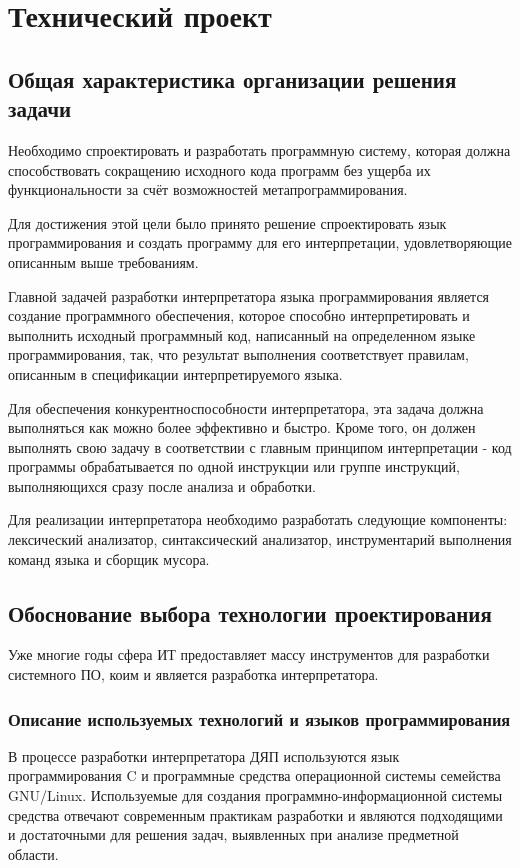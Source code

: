\section{Технический проект}
\subsection{Общая характеристика организации решения задачи}

Необходимо спроектировать и разработать программную систему, которая должна способствовать сокращению исходного кода программ без ущерба их функциональности за счёт возможностей метапрограммирования.

Для достижения этой цели было принято решение спроектировать язык программирования и создать программу для его интерпретации, удовлетворяющие описанным выше требованиям.

Главной задачей разработки интерпретатора языка программирования является создание программного обеспечения, которое способно интерпретировать и выполнить исходный программный код, написанный на определенном языке программирования, так, что результат выполнения соответствует правилам, описанным в спецификации интерпретируемого языка.

Для обеспечения конкурентноспособности интерпретатора, эта задача должна выполняться как можно более эффективно и быстро. Кроме того, он должен выполнять свою задачу в соответствии с главным принципом интерпретации - код программы обрабатывается по одной инструкции или группе инструкций, выполняющихся сразу после анализа и обработки. 

Для реализации интерпретатора необходимо разработать следующие компоненты: лексический анализатор, синтаксический анализатор, инструментарий выполнения команд языка и сборщик мусора.

\subsection{Обоснование выбора технологии проектирования}

Уже многие годы сфера ИТ предоставляет массу инструментов для разработки системного ПО, коим и является разработка интерпретатора.

\subsubsection{Описание используемых технологий и языков программирования}

В процессе разработки интерпретатора ДЯП используются язык программирования C и программные средства операционной системы семейства GNU/Linux. Используемые для создания программно-информационной системы средства отвечают современным практикам разработки и являются подходящими и достаточными для решения задач, выявленных при анализе предметной области.


